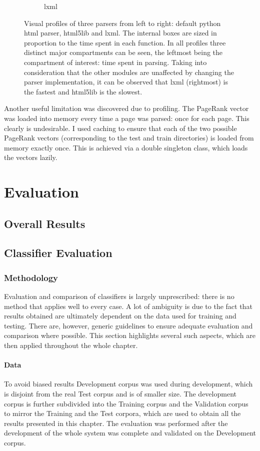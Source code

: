 \documentclass[12pt,notitlepage,twoside]{scrreprt}
\begin{document}
\begin{figure}[h!]
\begin{subfigure}[b]{.3\textwidth}
  \caption{lxml}
  \label{lxml}
\end{subfigure}
\caption{Visual profiles of three parsers from left to right: default python
html parser, html5lib and lxml. The internal boxes are sized in proportion to
the time spent in each function. In all profiles three distinct major
compartments can be seen, the leftmost being the compartment of interest: 
time spent in parsing. Taking into consideration that the other modules are unaffected by changing the parser
implementation, it can be observed that lxml (rightmost) is the fastest and
html5lib is the slowest.\label{parsers}}
\end{figure}

Another useful limitation was discovered due to profiling. The PageRank vector
was loaded into memory every time a page was parsed: once for each page. This
clearly is undesirable. I used caching to ensure that each of the two possible
PageRank vectors (corresponding to the test and train directories) is loaded
from memory exactly once. This is achieved via a double singleton class, which
loads the vectors lazily.

\cleardoublepage

\chapter{Evaluation}

\section{Overall Results}
\section{Classifier Evaluation}

\subsection{Methodology}
Evaluation and comparison of classifiers is largely unprescribed: there is no method
that applies well to every case. A lot of ambiguity is due to the fact that results obtained are
ultimately dependent on the data used for training and testing. There are, however,
generic guidelines to ensure adequate evaluation and comparison where possible. 
This section highlights several such aspects, which are then applied throughout the whole
chapter.
\subsubsection{Data}
To avoid biased results Development corpus was
used during development, which is disjoint from the real Test corpus and is of
smaller size. The development corpus is further subdivided into the Training
corpus and the Validation corpus to mirror the Training and the Test corpora,
which are used to obtain all the results presented in this chapter.
The evaluation was performed after the development of the whole system was
complete and validated on the Development corpus.
\end{document}
